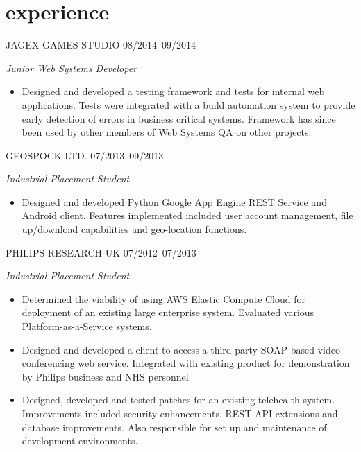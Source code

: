 \section{experience}
\begin{entrylist}
\entry
{JAGEX GAMES STUDIO}
{08/2014--09/2014}
{
\emph{Junior Web Systems Developer}
\begin{itemize}[topsep=0pt]
\item Designed and developed a testing framework and tests for internal web applications. Tests were integrated with a build automation system to provide early detection of errors in business critical systems. Framework has since been used by other members of Web Systems QA on other projects.
\end{itemize}
}
\entry
{GEOSPOCK LTD.}
{07/2013--09/2013}
{
\emph{Industrial Placement Student}
\begin{itemize}[topsep=0pt]
\item Designed and developed Python Google App Engine REST Service and Android client. Features implemented included user account management, file up/download capabilities and geo-location functions.
\end{itemize}
}
\entry
{PHILIPS RESEARCH UK}
{07/2012--07/2013}
{
\emph{Industrial Placement Student}\\
\begin{itemize}[topsep=0pt]
\item Determined the viability of using AWS Elastic Compute Cloud for deployment of an existing large enterprise system. Evaluated various Platform-as-a-Service systems.
\end{itemize}

\begin{itemize}[topsep=0pt]
\item Designed and developed a client to access a third-party SOAP based video conferencing web service. Integrated with existing product for demonstration by Philips business and NHS personnel.
\end{itemize}

\begin{itemize}
\item Designed, developed and tested patches for an existing telehealth system. Improvements included security enhancements, REST API extensions and database improvements. Also responsible for set up and maintenance of development environments.
\end{itemize}}
\end{entrylist}